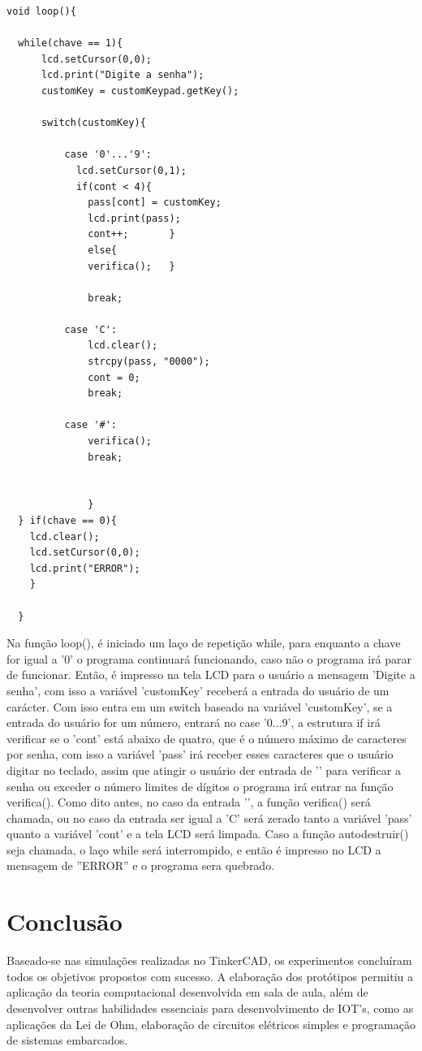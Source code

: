 \documentclass[conference]{IEEEtran}
\begin{document}
        \begin{lstlisting}
void loop(){

  while(chave == 1){
      lcd.setCursor(0,0);
      lcd.print("Digite a senha");
      customKey = customKeypad.getKey();

      switch(customKey){

          case '0'...'9':
            lcd.setCursor(0,1);
            if(cont < 4){
              pass[cont] = customKey;
              lcd.print(pass);
              cont++;		}
              else{
              verifica();	}

              break;

          case 'C':
              lcd.clear();
              strcpy(pass, "0000");
              cont = 0;
              break;

          case '#':
              verifica();
              break;


              }
  } if(chave == 0){
    lcd.clear();
    lcd.setCursor(0,0);
    lcd.print("ERROR");
  	}

  }
        \end{lstlisting}
        Na função loop(), é iniciado um laço de repetição while,
        para enquanto a chave for igual a ’0’ o programa continuará
        funcionando, caso não o programa irá parar de funcionar.
        Então, é impresso na tela LCD para o usuário a mensagem
        ’Digite a senha’, com isso a variável ’customKey’ receberá
        a entrada do usuário de um carácter. Com isso entra em
        um switch baseado na variável ’customKey’, se a entrada do
        usuário for um número, entrará no case ’0...9’, a estrutura if
        irá verificar se o ’cont’ está abaixo de quatro, que é o número
        máximo de caracteres por senha, com isso a variável ’pass’
        irá receber esses caracteres que o usuário digitar no teclado,
        assim que atingir o usuário der entrada de ’’ para verificar a
        senha ou exceder o número limites de dígitos o programa irá
        entrar na função verifica(). Como dito antes, no caso da entrada
        ’’, a função verifica() será chamada, ou no caso da entrada
        ser igual a ’C’ será zerado tanto a variável ’pass’ quanto a
        variável ’cont’ e a tela LCD será limpada. Caso a função
        autodestruir() seja chamada, o laço while será interrompido,
        e então é impresso no LCD a mensagem de ”ERROR” e o
        programa sera quebrado.
\section{Conclusão}
Baseado-se nas simulações realizadas no TinkerCAD, os
experimentos concluíram todos os objetivos propostos com
sucesso. A elaboração dos protótipos permitiu a aplicação
da teoria computacional desenvolvida em sala de aula, além
de desenvolver outras habilidades essenciais para desenvolvimento 
de IOT’s, como as aplicações da Lei de Ohm,
elaboração de circuitos elétricos simples e programação de
sistemas embarcados.


    
    
    
    
\end{document}
